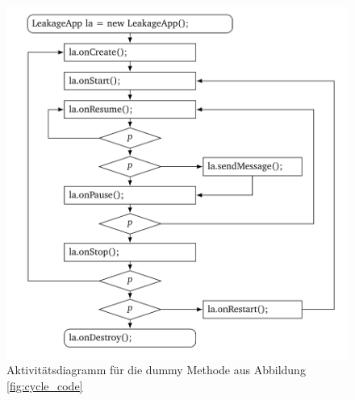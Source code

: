 \documentclass[runningheads]{llncs}
\begin{document}
\begin{figure}[t]
\centering
\includegraphics[scale=1.2]{img/lifecycle.png}
\caption{Aktivitätsdiagramm für die dummy Methode aus Abbildung \ref{fig:cycle_code}}
\label{fig:cycle_dummy}
\end{figure} 
\end{document}
